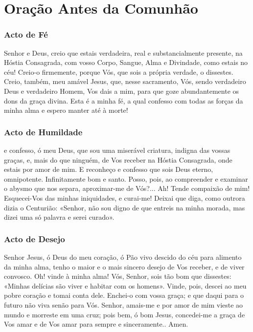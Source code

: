 \section{Oração Antes da Comunhão}\label{oracaoantescomunhao}

\subsubsection{Acto de Fé}

 Senhor e Deus, creio que estais verdadeira, real e substancialmente presente, na Hóstia Consagrada, com vosso Corpo, Sangue, Alma e Divindade, como estais no céu! Creio-o firmemente, porque Vós, que sois a própria verdade, o dissestes. Creio, também, meu amável Jesus, que, nesse sacramento, Vós, sendo verdadeiro Deus e verdadeiro Homem, Vos dais a mim, para que goze abundantemente os dons da graça divina. Esta é a minha fé, a qual confesso com todas as forças da minha alma e espero manter até à morte!

\subsubsection{Acto de Humildade}
 e confesso, ó meu Deus, que sou uma miserável criatura, indigna das vossas graças, e, mais do que ninguém, de Vos receber na Hóstia Consagrada, onde estais por amor de mim. E reconheço e confesso que sois Deus eterno, omnipotente. Infinitamente bom e santo. Posso, pois, ao compreender e examinar o abysmo que nos separa, aproximar-me de Vós?... Ah! Tende compaixão de mim! Esquecei-Vos das minhas iniquidades, e curai-me! Deixai que diga, como outrora dizia o Centurião: «Senhor, não sou digno de que entreis na minha morada, mas dizei uma só palavra e serei curado».

\subsubsection{Acto de Desejo}

 Senhor Jesus, ó Deus do meu coração, ó Pão vivo descido do céu para alimento da minha alma, tenho o maior e o mais sincero desejo de Vos receber, e de viver convosco. Oh! vinde à minha alma! Vós, Senhor, sois tão bom que dissestes: «Minhas delícias são viver e habitar com os homens». Vinde, pois, descei ao meu pobre coração e tomai conta dele. Enchei-o com vossa graça; e que daqui para o futuro não viva senão para Vós. Senhor, amais-me e por amor de mim vieste ao mundo e morreste em uma cruz; pois bem, ó bom Jesus, concedei-me a graça de Vos amar e de Vos amar para sempre e sinceramente.. Amen.

